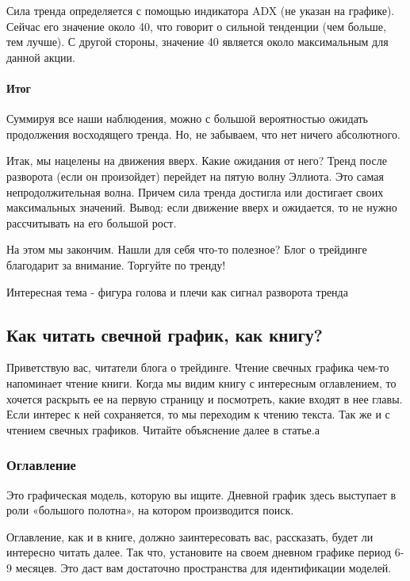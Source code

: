 \documentclass[a5paper]{article}
\begin{document}
Сила тренда определяется с помощью индикатора ADX (не указан на
графике). Сейчас его значение около 40, что говорит о сильной
тенденции (чем больше, тем лучше). С другой стороны, значение 40
является около максимальным для данной акции.

\paragraph{Итог}

Суммируя все наши наблюдения, можно с большой вероятностью ожидать продолжения восходящего тренда. Но, не забываем, что нет ничего абсолютного.

Итак, мы нацелены на движения вверх. Какие ожидания от него? Тренд после разворота (если он произойдет) перейдет на пятую волну Эллиота. Это самая непродолжительная волна. Причем сила тренда достигла или достигает своих максимальных значений. Вывод: если движение вверх и ожидается, то не нужно рассчитывать на его большой рост.

На этом мы закончим. Нашли для себя что-то полезное? Блог о трейдинге благодарит за внимание. Торгуйте по тренду!


Интересная тема - фигура голова и плечи как сигнал разворота тренда

\subsection{Как читать свечной график, как книгу?}

Приветствую вас, читатели блога о трейдинге. Чтение свечных графика
чем-то напоминает чтение книги. Когда мы видим книгу с интересным
оглавлением, то хочется раскрыть ее на первую страницу и посмотреть,
какие входят в нее главы. Если интерес к ней сохраняется, то мы
переходим к чтению текста. Так же и с чтением свечных
графиков. Читайте объяснение далее в статье.а

\subsubsection{Оглавление}

Это графическая модель, которую вы ищите. Дневной график здесь выступает в роли «большого полотна», на котором производится поиск.

Оглавление, как и в книге, должно заинтересовать вас, рассказать, будет ли интересно читать далее. Так что, установите на своем дневном графике период 6-9 месяцев. Это даст вам достаточно пространства для идентификации моделей.
\end{document}
